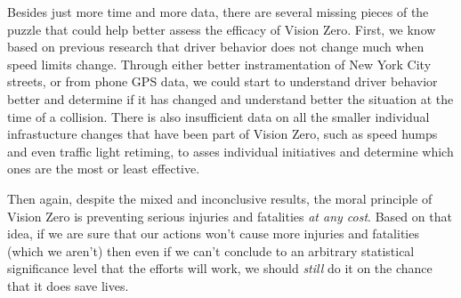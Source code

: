 \documentclass[10pt,journal,compsoc]{IEEEtran}
\begin{document}
Besides just more time and more data, there are several missing pieces of the puzzle that could help better assess the efficacy of Vision Zero.  First, we know based on previous research that driver behavior does not change much when speed limits change.  Through either better instramentation of New York City streets, or from phone GPS data, we could start to understand driver behavior better and determine if it has changed and understand better the situation at the time of a collision.  There is also insufficient data on all the smaller individual infrastucture changes that have been part of Vision Zero, such as speed humps and even traffic light retiming, to asses individual initiatives and determine which ones are the most or least effective.  

Then again, despite the mixed and inconclusive results, the moral principle of Vision Zero is preventing serious injuries and fatalities \textit{at any cost}.  Based on that idea, if we are sure that our actions won't cause more injuries and fatalities (which we aren't) then even if we can't conclude to an arbitrary statistical significance level that the efforts will work, we should \textit{still} do it on the chance that it does save lives.    



%
\end{document}
